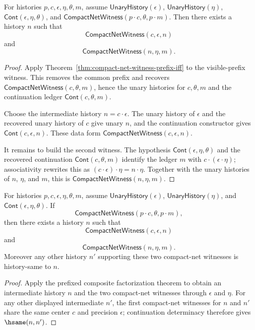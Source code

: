 \begin{theorem}
\label{thm:compact-net-witness-prefixed-composite-factorizes}
For histories $p,c,\epsilon,\eta,\theta,m$, assume
$\mathsf{UnaryHistory}(\epsilon)$,
$\mathsf{UnaryHistory}(\eta)$,
$\mathsf{Cont}(\epsilon,\eta,\theta)$, and
$\mathsf{CompactNetWitness}(p \cdot c,\theta,p \cdot m)$. Then there exists a
history $n$ such that
$$
\mathsf{CompactNetWitness}(c,\epsilon,n)
$$
and
$$
\mathsf{CompactNetWitness}(n,\eta,m).
$$
\end{theorem}
\begin{proof}
Apply Theorem~\ref{thm:compact-net-witness-prefix-iff} to the visible-prefix
witness. This removes the common prefix and recovers
$\mathsf{CompactNetWitness}(c,\theta,m)$, hence the unary histories for
$c,\theta,m$ and the continuation ledger $\mathsf{Cont}(c,\theta,m)$.

Choose the intermediate history $n=c\cdot\epsilon$. The unary history of
$\epsilon$ and the recovered unary history of $c$ give unary $n$, and the
continuation constructor gives $\mathsf{Cont}(c,\epsilon,n)$. These data form
$\mathsf{CompactNetWitness}(c,\epsilon,n)$.

It remains to build the second witness. The hypothesis
$\mathsf{Cont}(\epsilon,\eta,\theta)$ and the recovered continuation
$\mathsf{Cont}(c,\theta,m)$ identify the ledger $m$ with
$c\cdot(\epsilon\cdot\eta)$; associativity rewrites this as
$(c\cdot\epsilon)\cdot\eta=n\cdot\eta$. Together with the unary histories of
$n$, $\eta$, and $m$, this is $\mathsf{CompactNetWitness}(n,\eta,m)$.
\end{proof}

\begin{theorem}
\label{thm:compact-net-witness-prefixed-composite-middle-deterministic-factorization}
For histories $p,c,\epsilon,\eta,\theta,m$, assume
$\mathsf{UnaryHistory}(\epsilon)$,
$\mathsf{UnaryHistory}(\eta)$, and
$\mathsf{Cont}(\epsilon,\eta,\theta)$. If
$$
\mathsf{CompactNetWitness}(p \cdot c,\theta,p \cdot m),
$$
then there exists a history $n$ such that
$$
\mathsf{CompactNetWitness}(c,\epsilon,n)
$$
and
$$
\mathsf{CompactNetWitness}(n,\eta,m).
$$
Moreover any other history $n'$ supporting these two compact-net witnesses is
history-same to $n$.
\end{theorem}
\begin{proof}
Apply the prefixed composite factorization theorem to obtain an intermediate
history $n$ and the two compact-net witnesses through $\epsilon$ and $\eta$.
For any other displayed intermediate $n'$, the first compact-net witnesses for
$n$ and $n'$ share the same center $c$ and precision $\epsilon$; continuation
determinacy therefore gives $\hsame(n,n')$.
\end{proof}

